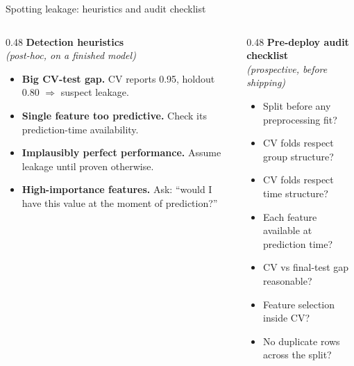 \documentclass[10pt,compress,t,notes=noshow, xcolor=table]{beamer}
\begin{document}
\begin{frame}{Spotting leakage: heuristics and audit checklist}
\label{leakage-detection}

\begin{columns}[T, totalwidth=\textwidth]

\begin{column}{0.48\textwidth}
\textbf{Detection heuristics}\\
\textit{\footnotesize (post-hoc, on a finished model)}

\medskip
\footnotesize
\begin{itemize}\setlength\itemsep{0.55em}
  \item \textbf{Big CV-test gap.} CV reports 0.95, holdout 0.80 $\Rightarrow$ suspect leakage.
  \item \textbf{Single feature too predictive.} Check its prediction-time availability.
  \item \textbf{Implausibly perfect performance.} Assume leakage until proven otherwise.
  \item \textbf{High-importance features.} Ask: ``would I have this value at the moment of prediction?''
\end{itemize}
\end{column}

\begin{column}{0.48\textwidth}
\textbf{Pre-deploy audit checklist}\\
\textit{\footnotesize (prospective, before shipping)}

\medskip
\footnotesize
\begin{itemize}\setlength\itemsep{0.25em}
  \item[$\square$] Split before any preprocessing fit?
  \item[$\square$] CV folds respect group structure?
  \item[$\square$] CV folds respect time structure?
  \item[$\square$] Each feature available at prediction time?
  \item[$\square$] CV vs final-test gap reasonable?
  \item[$\square$] Feature selection inside CV?
  \item[$\square$] No duplicate rows across the split?
\end{itemize}
\end{column}
\end{columns}

\end{frame}


\endlecture
\end{document}
